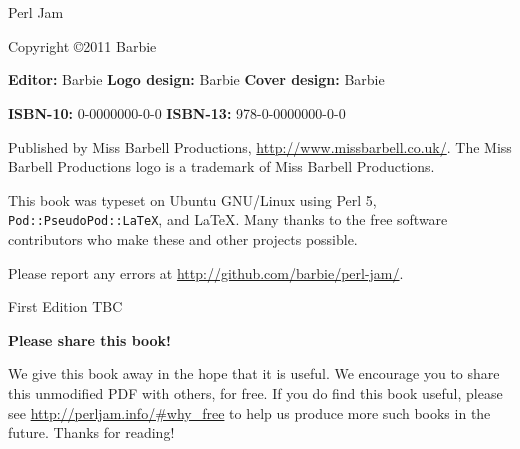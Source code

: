 \chapter*{}
\thispagestyle{empty}

\huge{Perl Jam}
\newline
\newline
\normalsize

Copyright \copyright\mbox{}2011 Barbie

\vfill
\textbf{Editor:} Barbie\newline
\textbf{Logo design:} Barbie\newline
\textbf{Cover design:} Barbie

\textbf{ISBN-10:} 0-0000000-0-0\newline
\textbf{ISBN-13:} 978-0-0000000-0-0

Published by Miss Barbell Productions, \url{http://www.missbarbell.co.uk/}.
The Miss Barbell Productions logo is a trademark of Miss Barbell Productions.

This book was typeset on Ubuntu GNU/Linux using Perl 5,
\texttt{Pod::PseudoPod::LaTeX}, and LaTeX. Many thanks to the free software
contributors who make these and other projects possible.

Please report any errors at
\url{http://github.com/barbie/perl-jam/}.

First Edition TBC

\pagebreak
\thispagestyle{empty}

\huge
\textbf{Please share this book!}
\newline
\newline
\normalsize

We give this book away in the hope that it is useful.  We encourage you to
share this unmodified PDF with others, for free.  If you do find this book
useful, please see \url{http://perljam.info/#why_free} to
help us produce more such books in the future.
\newline
Thanks for reading!
